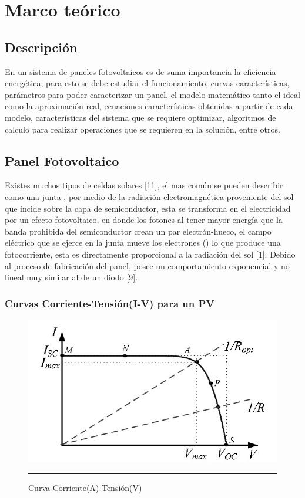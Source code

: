 \chapter{Marco teórico}
\label{ch:marco}

\section{Descripción}

En un sistema de paneles fotovoltaicos es de suma importancia la eficiencia energética, para esto se debe estudiar el funcionamiento, curvas características, parámetros para poder caracterizar un panel, el modelo matemático tanto el ideal como la aproximación real, ecuaciones características obtenidas a partir de cada modelo, características del sistema que se requiere optimizar, algoritmos de calculo para realizar operaciones que se requieren en la solución, entre otros.

\section{Panel Fotovoltaico}

Existes muchos tipos de celdas solares [11], el mas común se pueden describir como una junta , por medio de la radiación electromagnética proveniente del sol que incide sobre la capa de semiconductor, esta se transforma en el electricidad por un efecto fotovoltaico, en donde los fotones al tener mayor energía que la banda prohibida del semiconductor crean un par electrón-hueco, el campo eléctrico que se ejerce en la junta  mueve los electrones () lo que produce una fotocorriente, esta es directamente proporcional a la radiación del sol [1]. Debido al proceso de fabricación del panel, posee un comportamiento exponencial y no lineal muy similar al de un diodo [9]. 

\subsection{Curvas Corriente-Tensión(I-V) para un PV }

\begin{figure}[H]
  \centering
    \includegraphics[scale=0.6]{./IV.jpg}
    \rule{35em}{0.5pt}
  \caption[Curva Corriente(A)-Tensión(V)]{Curva Corriente(A)-Tensión(V) }
  \label{fig:Curva_PV}
\end{figure}

